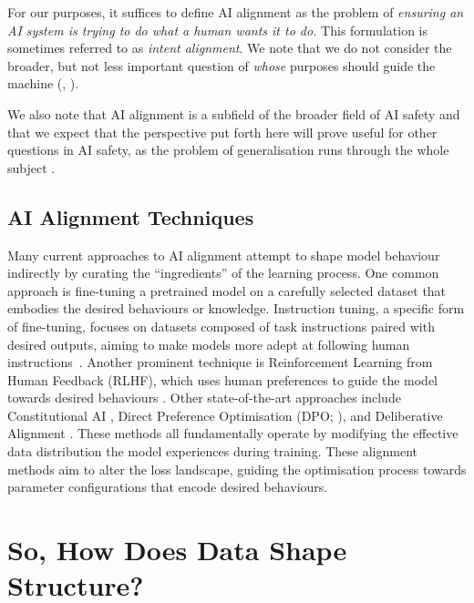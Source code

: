 For our purposes, it suffices to define AI alignment as the problem of \emph{ensuring an AI system is trying to do what a human wants it to do.} This formulation is sometimes referred to as \textit{intent alignment}. 
%
We note that we do not consider the broader, but not less important question of \textit{whose} purposes should guide the machine (\citealt{christiano2018a}, \citealt[\S4]{ngo2020agi}).

We also note that AI alignment is a subfield of the broader field of AI safety and that we expect that the perspective put forth here will prove useful for other questions in AI safety, as the problem of generalisation runs through the whole subject \citep{kosoy,sharkey2025open,burns2023weak,ilyas2019adversarial,casper2023open,korbak2025sketch,anwar2024foundationalchallengesassuringalignment}.

\subsection{AI Alignment Techniques}


Many current approaches to AI alignment attempt to shape model behaviour indirectly by curating the ``ingredients'' of the learning process. One common approach is fine-tuning a pretrained model on a carefully selected dataset that embodies the desired behaviours or knowledge. Instruction tuning, a specific form of fine-tuning, focuses on datasets composed of task instructions paired with desired outputs, aiming to make models more adept at following human instructions~\citep{wei2021finetuned}. Another prominent technique is Reinforcement Learning from Human Feedback (RLHF), which uses human preferences to guide the model towards desired behaviours \citep{ouyang2022training}. Other state-of-the-art approaches include Constitutional AI \citep{bai2022constitutional}, Direct Preference Optimisation (DPO; \citealt{rafailov2024direct}), and Deliberative Alignment \citep{guan2025deliberativealignmentreasoningenables}. These methods all fundamentally operate by modifying the effective data distribution the model experiences during training.
% 
These alignment methods aim to alter the loss landscape, guiding the optimisation process towards parameter configurations that encode desired behaviours.

\section{So, How Does Data Shape Structure?}\label{section:slt}

